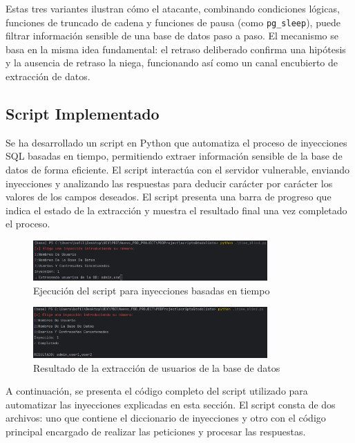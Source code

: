 \documentclass[a4paper,12pt]{article}
\begin{document}
\medskip

Estas tres variantes ilustran cómo el atacante, combinando condiciones lógicas, funciones de truncado de cadena y funciones de pausa (como \texttt{pg\_sleep}), puede filtrar información sensible de una base de datos paso a paso. El mecanismo se basa en la misma idea fundamental: el retraso deliberado confirma una hipótesis y la ausencia de retraso la niega, funcionando así como un canal encubierto de extracción de datos.


\subsection{Script Implementado}

Se ha desarrollado un script en Python que automatiza el proceso de inyecciones SQL basadas en tiempo, permitiendo extraer información sensible de la base de datos de forma eficiente. El script interactúa con el servidor vulnerable, enviando inyecciones y analizando las respuestas para deducir carácter por carácter los valores de los campos deseados.
El script presenta una barra de progreso que indica el estado de la extracción y muestra el resultado final una vez completado el proceso.

\begin{figure}[H]
    \centering
    \includegraphics[width=0.8\textwidth]{Imagenes/Time_Blind_Script.png}
    \caption{Ejecución del script para inyecciones basadas en tiempo}
\end{figure}

\begin{figure}[H]
    \centering
    \includegraphics[width=0.8\textwidth]{Imagenes/Time_Blind_Script2.png}
    \caption{Resultado de la extracción de usuarios de la base de datos}
\end{figure}

A continuación, se presenta el código completo del script utilizado para automatizar las inyecciones explicadas en esta sección. El script consta de dos archivos: uno que contiene el diccionario de inyecciones y otro con el código principal encargado de realizar las peticiones y procesar las respuestas. 
\end{document}
